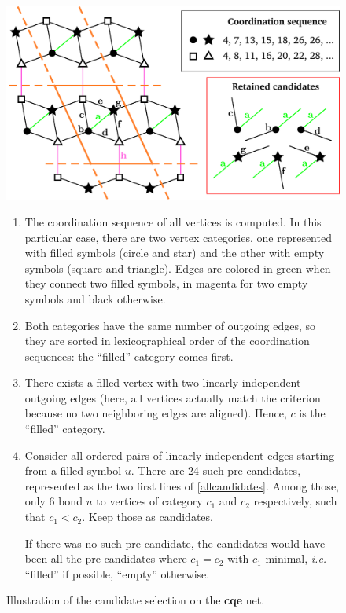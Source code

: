 \documentclass[main.tex]{subfiles}
\begin{document}
\begin{itemize}[noitemsep]
	\begin{figure}[p]
		\begin{center}
			\includegraphics[width=0.79\linewidth]{figures/topology/spacereduction.pdf}
		\end{center}
		\begin{enumerate}[itemsep=0pt]
			\item The coordination sequence of all vertices is computed. In this particular case, there are two vertex categories, one represented with filled symbols (circle and star) and the other with empty symbols (square and triangle). Edges are colored in {\color{green}green} when they connect two filled symbols, in {\color{freespeechmagenta}magenta} for two empty symbols and black otherwise.
			\item Both categories have the same number of outgoing edges, so they are sorted in lexicographical order of the coordination sequences: the ``filled'' category comes first.
			\item There exists a filled vertex with two linearly independent outgoing edges (here, all vertices actually match the criterion because no two neighboring edges are aligned). Hence, $c$ is the ``filled'' category.
			\item Consider all ordered pairs of linearly independent edges starting from a filled symbol $u$. There are 24 such pre-candidates, represented as the two first lines of \cref{allcandidates}. Among those, only 6 bond $u$ to vertices of category $c_1$ and $c_2$ respectively, such that $c_1 < c_2$. Keep those as candidates.
			
			If there was no such pre-candidate, the candidates would have been all the pre-candidates where $c_1 = c_2$ with $c_1$ minimal, \textit{i.e.} ``filled'' if possible, ``empty'' otherwise.
		\end{enumerate}
		\caption{Illustration of the candidate selection on the {\bf cqe} net.}
		\label{candidateselection}
	\end{figure}
	

\end{itemize}
\end{document}
